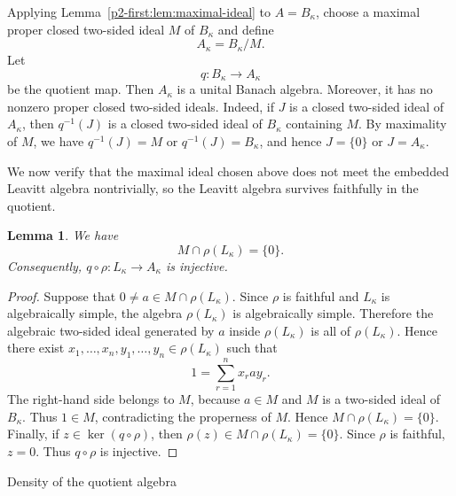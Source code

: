 \documentclass[11pt,reqno]{amsart}
\makeatletter
\theoremstyle{plain}
\newtheorem{lemma}[lemma]{Lemma}
\theoremstyle{definition}
\newcounter{problempaper}
\newenvironment{problempaperbody}{%
  \setcounter{subsection}{0}%
  \setcounter{subsubsection}{0}%
  \setcounter{paragraph}{0}%
  \renewcommand{\thesubsection}{\arabic{subsection}}%
  \renewcommand{\thesubsubsection}{\thesubsection.\arabic{subsubsection}}%
  \renewcommand{\theparagraph}{\thesubsubsection.\arabic{paragraph}}%
  \let\problem@outersection\section
  \let\problem@outersubsection\subsection
  \let\problem@outersubsubsection\subsubsection
  \let\problem@outerparagraph\paragraph
  \let\section\problem@papersection
  \let\subsection\problem@papersubsection
  \let\subsubsection\problem@papersubsubsection
}{%
  \let\section\problem@outersection
  \let\subsection\problem@outersubsection
  \let\subsubsection\problem@outersubsubsection
  \let\paragraph\problem@outerparagraph
}
\newcommand{\problem@target}[2]{%
  \hypertarget{problem-\theproblempaper-#1-#2}{}%
}
\newcommand{\problem@paperheading}[3]{%
  \par\bigskip
  \problem@target{#1}{#2}%
  \noindent{\large\bfseries #2.\quad #3\par}%
  \nobreak\smallskip
}
\newcommand{\problem@papersubheading}[3]{%
  \par\medskip
  \problem@target{#1}{#2}%
  \noindent{\normalsize\bfseries #2.\quad #3\par}%
  \nobreak\smallskip
}
\newcommand{\problem@papersubsubheading}[3]{%
  \par\smallskip
  \problem@target{#1}{#2}%
  \noindent{\normalsize\itshape #2.\quad #3.\ }%
}
\def\problem@papersection{%
  \@ifstar{\problem@papersectionstar}{\problem@papersectionnostar}%
}
\def\problem@papersectionstar#1{%
  \par\bigskip\noindent{\large\bfseries #1\par}\nobreak\smallskip
}
\def\problem@papersectionnostar#1{%
  \refstepcounter{subsection}%
  \setcounter{subsubsection}{0}%
  \setcounter{paragraph}{0}%
  \problem@paperheading{section}{\thesubsection}{#1}%
  \problem@writecontentsline{section}{\thesubsection}{#1}%
}
\def\problem@papersubsection{%
  \@ifstar{\problem@papersubsectionstar}{\problem@papersubsectionnostar}%
}
\def\problem@papersubsectionstar#1{%
  \par\medskip\noindent{\normalsize\bfseries #1\par}\nobreak\smallskip
}
\def\problem@papersubsectionnostar#1{%
  \refstepcounter{subsubsection}%
  \setcounter{paragraph}{0}%
  \problem@papersubheading{subsection}{\thesubsubsection}{#1}%
  \problem@writecontentsline{subsection}{\thesubsubsection}{#1}%
}
\def\problem@papersubsubsection{%
  \@ifstar{\problem@papersubsubsectionstar}{\problem@papersubsubsectionnostar}%
}
\def\problem@papersubsubsectionstar#1{%
  \par\smallskip\noindent{\normalsize\itshape #1.\ }%
}
\def\problem@papersubsubsectionnostar#1{%
  \refstepcounter{paragraph}%
  \problem@papersubsubheading{subsubsection}{\theparagraph}{#1}%
  \problem@writecontentsline{subsubsection}{\theparagraph}{#1}%
}
\newcommand{\problem@writecontentsline}[3]{%
  \begingroup
  \protected@write\@auxout{}{%
    \string\problemcontentsentry{\theproblempaper}{#1}{#2}{#3}{\thepage}%
  }%
  \endgroup
}
\newcommand{\problemcontentsentry}[5]{%
  \@ifundefined{problemcontents@#1}{%
    \expandafter\gdef\csname problemcontents@#1\endcsname{}%
  }{}%
  \expandafter\g@addto@macro\csname problemcontents@#1\endcsname{%
    \problemcontentsline{#1}{#2}{#3}{#4}{#5}%
  }%
}
\newcommand{\problemcontentslink}[4]{%
  \hyperlink{problem-#1-#2-#3}{#4}%
}
\newcommand{\problemcontentsline}[5]{%
  \ifstrequal{#2}{section}{%
    \par\noindent
    \problemcontentslink{#1}{#2}{#3}{\makebox[2.5em][l]{#3}#4}%
    \nobreak\dotfill
    \problemcontentslink{#1}{#2}{#3}{#5}\par
  }{%
    \ifstrequal{#2}{subsection}{%
      \par\noindent\hspace*{1.5em}%
      \problemcontentslink{#1}{#2}{#3}{\makebox[3.5em][l]{#3}#4}%
      \nobreak\dotfill
      \problemcontentslink{#1}{#2}{#3}{#5}\par
    }{%
      \par\noindent\hspace*{3em}%
      \problemcontentslink{#1}{#2}{#3}{\makebox[4.5em][l]{#3}#4}%
      \nobreak\dotfill
      \problemcontentslink{#1}{#2}{#3}{#5}\par
    }%
  }%
}
\makeatother
\begin{document}
\begin{problempaperbody}
Applying Lemma~\ref{p2-first:lem:maximal-ideal} to $A=B_\kappa$, choose a maximal proper closed two-sided ideal $M$ of $B_\kappa$ and define
\begin{equation*}
        A_\kappa=B_\kappa/M.
\end{equation*}
Let
\begin{equation*}
        q \colon B_\kappa\to A_\kappa
\end{equation*}
be the quotient map. Then $A_\kappa$ is a unital Banach algebra. Moreover, it has no nonzero proper closed two-sided ideals. Indeed, if $J$ is a closed two-sided ideal of $A_\kappa$, then $q^{-1}(J)$ is a closed two-sided ideal of $B_\kappa$ containing $M$. By maximality of $M$, we have $q^{-1}(J)=M$ or $q^{-1}(J)=B_\kappa$, and hence $J=\{0\}$ or $J=A_\kappa$.

We now verify that the maximal ideal chosen above does not meet the embedded Leavitt algebra nontrivially, so the Leavitt algebra survives faithfully in the quotient.

\begin{lemma}
\label{p2-first:lem:core-survives}
We have
\begin{equation*}
        M\cap\rho(L_\kappa)=\{0\}.
\end{equation*}
Consequently, $q\circ\rho:L_\kappa\to A_\kappa$ is injective.
\end{lemma}

\begin{proof}
Suppose that $0\ne a\in M\cap\rho(L_\kappa)$. Since $\rho$ is faithful and $L_\kappa$ is algebraically simple, the algebra $\rho(L_\kappa)$ is algebraically simple. Therefore the algebraic two-sided ideal generated by $a$ inside $\rho(L_\kappa)$ is all of $\rho(L_\kappa)$. Hence there exist $x_1,\ldots,x_n,y_1,\ldots,y_n\in\rho(L_\kappa)$ such that
\begin{equation*}
        1=\sum_{r=1}^{n}x_ray_r.
\end{equation*}
The right-hand side belongs to $M$, because $a\in M$ and $M$ is a two-sided ideal of $B_\kappa$. Thus $1\in M$, contradicting the properness of $M$. Hence $M\cap\rho(L_\kappa)=\{0\}$. Finally, if $z\in\ker(q\circ\rho)$, then $\rho(z)\in M\cap\rho(L_\kappa)=\{0\}$. Since $\rho$ is faithful, $z=0$. Thus $q\circ\rho$ is injective.
\end{proof}

\subsection{Density of the quotient algebra}
\label{p2-first:sec:density}


\end{problempaperbody}
\end{document}
